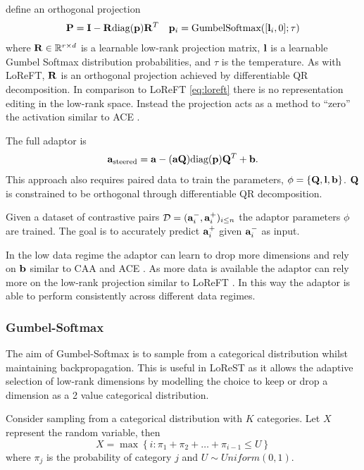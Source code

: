 \citet{steering-clear} define an orthogonal projection
\begin{align*}
    \mathbf{P} = \mathbf{I} - \mathbf{R}\text{diag}(\mathbf{p})\mathbf{R}^T && \mathbf{p}_i = \text{GumbelSoftmax}([\mathbf{l}_i,0];\tau)
\end{align*}
where $\mathbf{R} \in \mathbb{R}^{r\times d}$ is a learnable low-rank projection matrix, $\mathbf{l}$ is a learnable Gumbel Softmax distribution probabilities, and $\tau$ is the temperature.
As with LoReFT, $\mathbf{R}$ is an orthogonal projection achieved by differentiable QR decomposition.
In comparison to LoReFT \cref{eq:loreft} there is no representation editing in the low-rank space.
Instead the projection acts as a method to ``zero'' the activation similar to ACE \citep{ace}.

The full adaptor is
\begin{equation}
    \mathbf{a}_\text{steered} = \mathbf{a} - (\mathbf{a}\mathbf{Q})\text{diag}(\mathbf{p})\mathbf{Q}^T + \mathbf{b}.
\end{equation}
This approach also requires paired data to train the parameters, $\phi = \{\mathbf{Q}, \mathbf{l}, \mathbf{b}\}$.
$\mathbf{Q}$ is constrained to be orthogonal through differentiable QR decomposition.

Given a dataset of contrastive pairs $\mathcal{D} = (\mathbf{a}_i^-, \mathbf{a}_i^+)_{i\le n}$ the adaptor parameters $\phi$ are trained.
The goal is to accurately predict $\mathbf{a}_i^+$ given $\mathbf{a}_i^-$ as input.

In the low data regime the adaptor can learn to drop more dimensions and rely on $\mathbf{b}$ similar to CAA \citep{caa} and ACE \citep{ace}.
As more data is available the adaptor can rely more on the low-rank projection similar to LoReFT \citep{reft}.
In this way the adaptor is able to perform consistently across different data regimes.

\subsubsection{Gumbel-Softmax}

The aim of Gumbel-Softmax is to sample from a categorical distribution whilst maintaining backpropagation.
This is useful in LoReST as it allows the adaptive selection of low-rank dimensions by modelling the choice to keep or drop a dimension as a 2 value categorical distribution.

Consider sampling from a categorical distribution with $K$ categories.
Let $X$ represent the random variable, then
\begin{equation*}
    X = \max\left\{i : \pi_1 + \pi_2 + \dots + \pi_{i-1} \le U\right\}
\end{equation*}
where $\pi_j$ is the probability of category $j$ and $U \sim Uniform(0,1)$.


